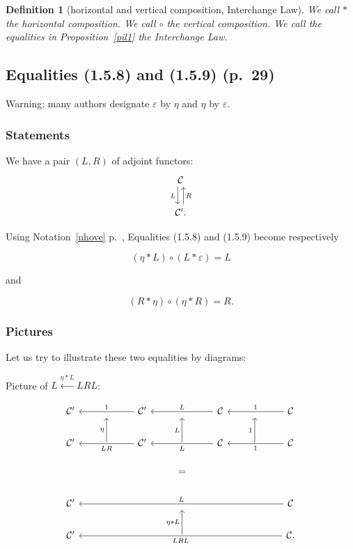 \documentclass[12pt]{article}
\newtheorem{df}[thm]{Definition}
\theoremstyle{remark}
\theoremstyle{definition}
\newcommand{\nn}{\noindent}
\newcommand{\C}{\mathcal C}
\newcommand{\ee}{\varepsilon}
\begin{document}
\begin{df}[horizontal and vertical composition, Interchange Law]\label{dil1} 
We call $*$ the {\em horizontal composition}. We call $\circ$ the {\em vertical composition}. We call the equalities in Proposition~\ref{pil1} the {\em Interchange Law}.
\end{df}


\subsection{Equalities (1.5.8) and (1.5.9) (p.~29)}

Warning: many authors designate $\varepsilon$ by $\eta$ and $\eta$ by $\varepsilon$. 

\subsubsection{Statements}

We have a pair $(L,R)$ of adjoint functors: 
$$
\begin{tikzcd}
\C\ar[xshift=-.7ex]{d}[swap]{L}\\ 
\C'.\ar[xshift=.7ex]{u}[swap]{R}
\end{tikzcd}
$$

Using Notation~\ref{nhove} p.~\pageref{nhove}, Equalities (1.5.8) and (1.5.9) become respectively 

\begin{equation}\label{158}
(\eta*L)\circ(L*\ee)=L
\end{equation}

\nn and 

\begin{equation}\label{159}
(R*\eta)\circ(\eta*R)=R.
\end{equation}

\subsubsection{Pictures}

Let us try to illustrate these two equalities by diagrams:

Picture of $L\xleftarrow{\eta*L}LRL$:
 
$$
\begin{tikzcd}
%
\C'&{}&\C'\ar{ll}{}[swap]{1}&{}&\C\ar{ll}{}[swap]{L}&{}&\C\ar{ll}{}[swap]{1}\\ 
%
\C'&\ar{u}{\eta}&\C'\ar{ll}{}{LR}&\ar{u}{L}&\C\ar{ll}{}{L}&\ar{u}{1}&\C\ar{ll}{}{1}\\ 
%
&&&=\\ 
%
\C'&&&{}&&&\C\ar{llllll}[swap]{L}\\
%
\C'&&&\ar{u}{\eta*L}&&&\C\ar{llllll}{LRL}.
%
\end{tikzcd}
$$ 
\end{document}
